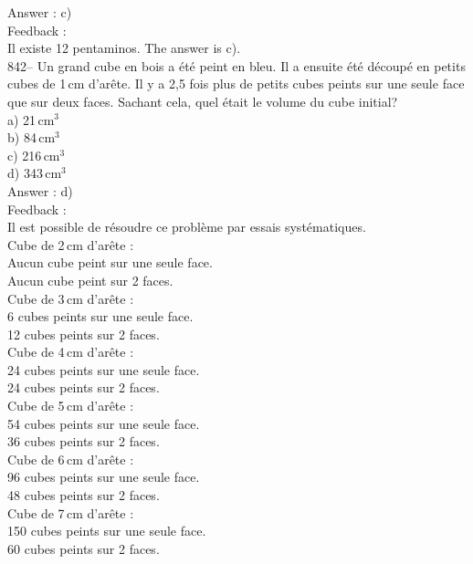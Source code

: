 ﻿\documentclass[letterpaper, 12pt]{article}
\begin{document}
Answer : c)\\

Feedback : \\
Il existe 12 pentaminos.  The answer is c).\\

842-- Un grand cube en bois a \'et\'e peint en bleu.  Il a ensuite \'et\'e
d\'ecoup\'e en petits cubes de 1\,cm d'ar\^ete.  Il y a 2,5 fois plus de
petits cubes peints sur une seule face que sur deux faces.  Sachant cela,
quel \'etait le volume du cube initial?\\
a) 21\,cm$^{3}$\\
b) 84\,cm$^{3}$\\
c) 216\,cm$^{3}$\\
d) 343\,cm$^{3}$\\

Answer : d)\\

Feedback : \\
Il est possible de r\'esoudre ce probl\`eme par essais syst\'ematiques.  \\
Cube de 2\,cm d'ar\^ete :\\
Aucun cube peint sur une seule face.\\
Aucun cube peint sur 2 faces.\\

Cube de 3\,cm d'ar\^ete :\\
6 cubes peints sur une seule face.\\
12 cubes peints sur 2 faces.\\

Cube de 4\,cm d'ar\^ete :\\
24 cubes peints sur une seule face.\\
24 cubes peints sur 2 faces.\\

Cube de 5\,cm d'ar\^ete :\\
54 cubes peints sur une seule face.\\
36 cubes peints sur 2 faces.\\

Cube de 6\,cm d'ar\^ete :\\
96 cubes peints sur une seule face.\\
48 cubes peints sur 2 faces.\\

Cube de 7\,cm d'ar\^ete :\\
150 cubes peints sur une seule face.\\
60 cubes peints sur 2 faces.\\
\end{document}
